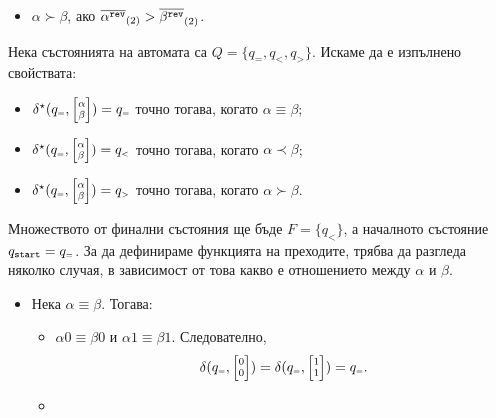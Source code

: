\begin{extra}
\begin{hint}
\begin{itemize}
  \item
    $\alpha \succ \beta$, ако $\overline{\alpha^{\texttt{rev}}}_{(2)} > \overline{\beta^{\texttt{rev}}}_{(2)}$.
  \end{itemize}
  Нека състоянията на автомата са $Q = \{q_{\scriptscriptstyle{=}},q_{\scriptscriptstyle{<}},q_{\scriptscriptstyle{>}}\}$.
  Искаме да е изпълнено свойствата:
  \begin{itemize}
  \item 
    $\delta^\star(q_{\scriptscriptstyle{=}}, \scriptsize{\begin{bmatrix} \alpha\\ \beta\end{bmatrix}}) = q_{\scriptscriptstyle{=}}$ точно тогава, когато $\alpha \equiv \beta$;
  \item 
    $\delta^\star(q_{\scriptscriptstyle{=}}, \scriptsize{\begin{bmatrix} \alpha\\ \beta\end{bmatrix}}) = q_{\scriptscriptstyle{<}}$ точно тогава, когато $\alpha \prec \beta$;
  \item 
    $\delta^\star(q_{\scriptscriptstyle{=}}, \scriptsize{\begin{bmatrix} \alpha\\ \beta\end{bmatrix}}) = q_{\scriptscriptstyle{>}}$ точно тогава, когато $\alpha \succ \beta$.
  \end{itemize}
  Множеството от финални състояния ще бъде $F = \{q_{\scriptscriptstyle{<}}\}$, а началното състояние $q_{\texttt{start}} = q_{\scriptscriptstyle{=}}$.
  За да дефинираме функцията на преходите, трябва да разгледа няколко случая, в зависимост от това какво е отношението между $\alpha$ и $\beta$.
  \begin{itemize}
  \item
    Нека $\alpha \equiv \beta$. Тогава:  
    \begin{itemize}
    \item 
      $\alpha 0 \equiv \beta 0$ и $\alpha 1 \equiv \beta 1$. Следователно,
      \[\delta(q_{\scriptscriptstyle{=}},\scriptsize{\begin{bmatrix} 0\\0\end{bmatrix}}) = \delta(q_{\scriptscriptstyle{=}},\scriptsize{\begin{bmatrix} 1\\1\end{bmatrix}}) = q_{\scriptscriptstyle{=}}.\]
    \item

\end{itemize}
\end{itemize}
\end{hint}
\end{extra}
